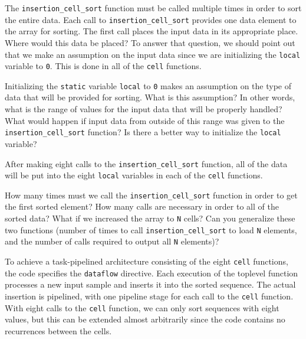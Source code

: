The \lstinline{insertion_cell_sort} function must be called multiple times in order to sort the entire data. Each call to \lstinline{insertion_cell_sort} provides one data element to the array for sorting. The first call places the input data in its appropriate place. Where would this data be placed? To answer that question, we should point out that we make an assumption on the input data since we are initializing the \lstinline{local} variable to \lstinline{0}. This is done in all of the \lstinline{cell} functions.

\begin{exercise}
Initializing the \lstinline{static} variable \lstinline{local} to \lstinline{0} makes an assumption on the type of data that will be provided for sorting. What is this assumption? In other words, what is the range of values for the input data that will be properly handled? What would happen if input data from outside of this range was given to the \lstinline{insertion_cell_sort} function? Is there a better way to initialize the \lstinline{local} variable?
\end{exercise}

After making eight calls to the \lstinline{insertion_cell_sort} function, all of the data will be put into the eight \lstinline{local} variables in each of the \lstinline{cell} functions. 

\begin{exercise}
How many times must we call the \lstinline{insertion_cell_sort} function in order to get the first sorted element? How many calls are necessary in order to all of the sorted data? What if we increased the array to \lstinline{N} cells? Can you generalize these two functions (number of times to call \lstinline{insertion_cell_sort} to load \lstinline{N} elements, and the number of calls required to output all \lstinline{N} elements)?
\end{exercise}

To achieve a task-pipelined architecture consisting of the eight \lstinline{cell} functions, the code specifies the \lstinline{dataflow} directive. Each execution of the toplevel function processes a new input sample and inserts it into the sorted sequence.  The actual insertion is pipelined, with one pipeline stage for each call to the \lstinline{cell} function. With eight calls to the \lstinline{cell} function, we can only sort sequences with eight values, but this can be extended almost arbitrarily since the code contains no recurrences between the cells.

